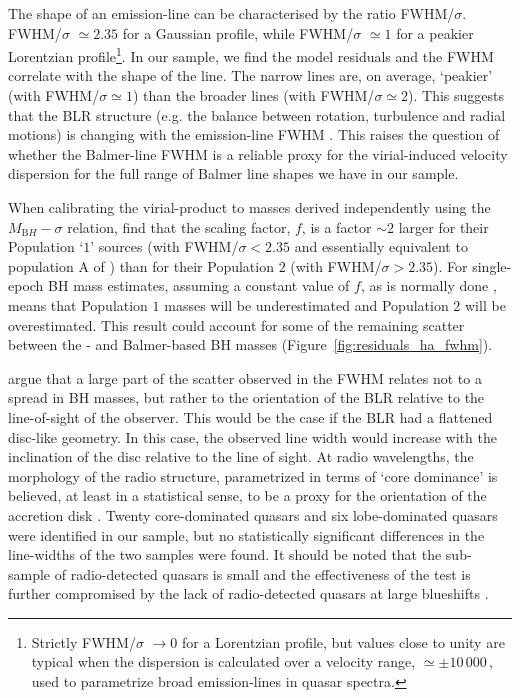 The shape of an emission-line can be characterised by the ratio FWHM/$\sigma$.  
FWHM/$\sigma$ $\simeq 2.35$ for a Gaussian profile, while FWHM/$\sigma$ $\simeq 1$ for a peakier Lorentzian profile\footnote{Strictly FWHM/$\sigma$ $\rightarrow 0$ for a Lorentzian profile, but values close to unity are typical when the dispersion is calculated over a velocity range, $\simeq\pm10\,000$\,\kms, used to parametrize broad emission-lines in quasar spectra.}.
In our sample, we find the model residuals and the \ha FWHM correlate with the shape of the line.   
The narrow lines are, on average, `peakier' (with FWHM/$\sigma\simeq1$) than the broader lines (with FWHM/$\sigma\simeq2$).   
This suggests that the BLR structure (e.g. the balance between rotation, turbulence and radial motions) is changing with the emission-line FWHM \citep[e.g.][]{collin06,kollatschny11,Kollatschny13}. 
This raises the question of whether the Balmer-line FWHM is a reliable proxy for the virial-induced velocity dispersion for the full range of Balmer line shapes we have in our sample. 

When calibrating the virial-product to masses derived independently using the $M_{\mathrm BH}-\sigma$ relation, \citet{collin06} find that the scaling factor, $f$, is a factor $\sim2$ larger for their Population `$1$' sources (with FWHM/$\sigma < 2.35$ and essentially equivalent to population A of \citealt{sulentic00b}) than for their Population $2$ (with FWHM/$\sigma > 2.35$). 
For single-epoch BH mass estimates, assuming a constant value of $f$, as is normally done \citep[e.g.][]{vestergaard06}, means that Population $1$ masses will be underestimated and Population $2$ will be overestimated.
This result could account for some of the remaining scatter between the - and Balmer-based BH masses (Figure~\ref{fig:residuals_ha_fwhm}). 

\citet{shen14} argue that a large part of the scatter observed in the \hb FWHM relates not to a spread in BH masses, but rather to the orientation of the BLR relative to the line-of-sight of the observer.
This would be the case if the BLR had a flattened disc-like geometry. 
In this case, the observed line width would increase with the inclination of the disc relative to the line of sight. 
At radio wavelengths, the morphology of the radio structure, parametrized in terms of `core dominance' is believed, at least in a statistical sense, to be a proxy for the orientation of the accretion disk \citep[e.g.][]{jackson91}.
Twenty core-dominated quasars and six lobe-dominated quasars were identified in our sample, but no statistically significant differences in the \ha line-widths of the two samples were found. 
It should be noted that the sub-sample of radio-detected quasars is small and the effectiveness of the test is further compromised by the lack of radio-detected quasars at large blueshifts \citep[see figure 14 of][for example]{richards11}.

